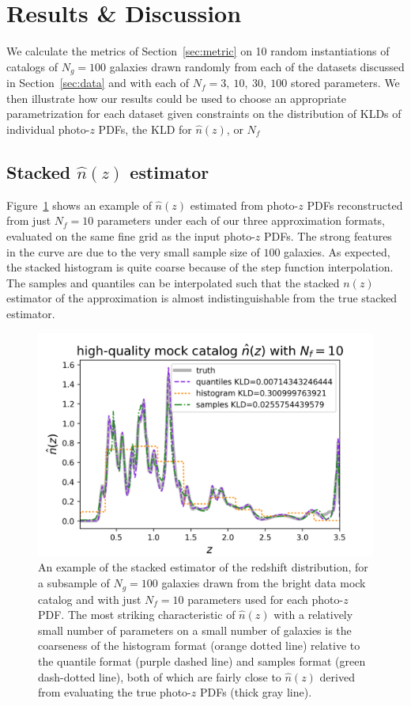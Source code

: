 \documentclass[\docopts]{\docclass}
\newcommand{\pz}{photo-$z$ PDF}
\newcommand{\mgdata}{bright\xspace}
\begin{document}
\section{Results \& Discussion}
\label{sec:results}


We calculate the metrics of Section~\ref{sec:metric} on 10 random 
instantiations of catalogs of $N_{g}=100$ galaxies drawn randomly from each of 
the datasets discussed in Section~\ref{sec:data} and with each of $N_{f}=3,\ 
10,\ 30,\ 100$ stored parameters.
We then illustrate how our results could be used to choose an appropriate 
parametrization for each dataset given constraints on the distribution of KLDs 
of individual \pz s, the KLD for $\hat{n}(z)$, or $N_{f}$


\subsection{Stacked $\hat{n}(z)$ estimator}
\label{sec:stacked_results}

Figure~\ref{fig:stacked} shows an example of $\hat{n}(z)$ estimated from \pz s 
reconstructed from just $N_{f}=10$ parameters under each of our three 
approximation formats, evaluated on the same fine grid as the input \pz s.
The strong features in the curve are due to the very small sample size of $100$ 
galaxies.
As expected, the stacked histogram is quite coarse because of the step function 
interpolation.
The samples and quantiles can be interpolated such that the stacked $n(z)$ 
estimator of the approximation is almost indistinguishable from the true 
stacked estimator.


\begin{figure}
  \includegraphics[width=0.9\columnwidth]{figures/stacked.png}
  \caption{An example of the stacked estimator of the redshift distribution, 
for a subsample of $N_{g}=100$ galaxies drawn from the \mgdata data mock 
catalog and with just $N_{f}=10$ parameters used for each \pz.
  The most striking characteristic of $\hat{n}(z)$ with a relatively small 
number of parameters on a small number of galaxies is the coarseness of the 
histogram format (orange dotted line) relative to the quantile format (purple 
dashed line) and samples format (green dash-dotted line), both of which are 
fairly close to $\hat{n}(z)$ derived from evaluating the true \pz s (thick gray 
line).
  \label{fig:stacked}}
\end{figure}
\end{document}
